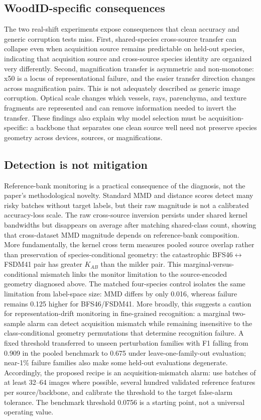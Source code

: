 \documentclass[a4paper,fleqn]{els-cas-templates/cas-sc}
\begin{document}
\subsection{WoodID-specific consequences}

The two real-shift experiments expose consequences that clean accuracy and
generic corruption tests miss. First, shared-species cross-source transfer can
collapse even when acquisition source remains predictable on held-out species,
indicating that acquisition source and cross-source species identity are
organized very differently. Second, magnification transfer is asymmetric and
non-monotone: x50 is a locus of representational failure, and the easier transfer
direction changes across magnification pairs. This is not adequately described
as generic image corruption. Optical scale changes which vessels, rays,
parenchyma, and texture fragments are represented and can remove information
needed to invert the transfer. These findings also explain why model selection
must be acquisition-specific: a backbone that separates one clean source well
need not preserve species geometry across devices, sources, or magnifications.

\subsection{Detection is not mitigation}

Reference-bank monitoring is a practical consequence of the diagnosis, not the
paper's methodological novelty. Standard MMD and distance scores detect many
risky batches without target labels, but their raw magnitude is not a calibrated
accuracy-loss scale. The raw cross-source inversion persists under shared
kernel bandwidths but disappears on average after matching shared-class count,
showing that cross-dataset MMD magnitude depends on reference-bank composition.
More fundamentally, the kernel cross term measures pooled source overlap rather
than preservation of species-conditional geometry: the catastrophic
BFS46$\leftrightarrow$FSDM41 pair has greater $K_{AB}$ than the milder pair.
This marginal-versus-conditional mismatch links the monitor limitation to the
source-encoded geometry diagnosed above. The matched four-species control
isolates the same limitation from label-space size: MMD differs by only 0.016,
whereas failure remains 0.125 higher for BFS46/FSDM41.
More broadly, this suggests a caution for representation-drift monitoring in
fine-grained recognition: a marginal two-sample alarm can detect acquisition
mismatch while remaining insensitive to the class-conditional geometry
permutations that determine recognition failure.
A fixed threshold transferred to unseen perturbation
families with F1 falling from 0.909 in the pooled benchmark to 0.675 under
leave-one-family-out evaluation; near-1\% failure families also make some held-out
evaluations degenerate.
Accordingly, the proposed recipe is an acquisition-mismatch alarm: use batches
of at least 32--64 images where possible, several hundred validated reference
features per source/backbone, and calibrate the threshold to the target
false-alarm tolerance. The benchmark threshold 0.0756 is a starting point, not a
universal operating value.
\end{document}
